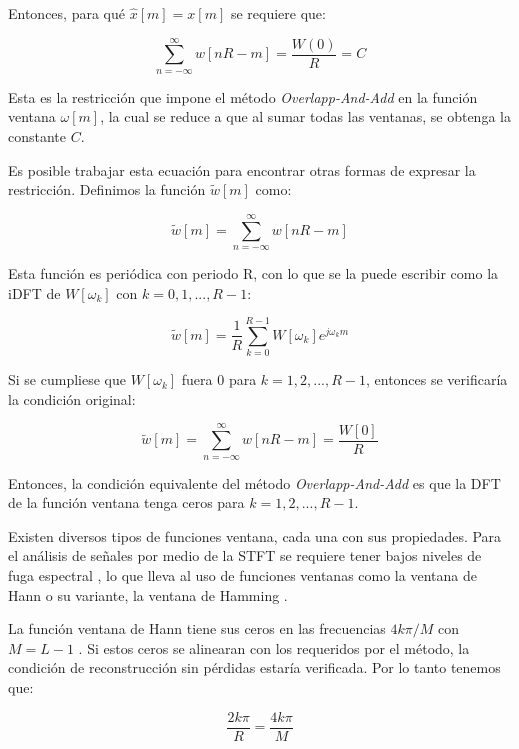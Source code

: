 Entonces, para qué $\hat{x}[m] = x[m]$ se requiere que:

\begin{equation*}
	\sum_{n=-\infty}^{\infty} w[nR-m] = \frac{W(0)}{R} = C
\end{equation*}

Esta es la restricción que impone el método \emph{Overlapp-And-Add} en la función ventana $\omega[m]$, la cual se reduce a que al sumar todas las ventanas, se obtenga la constante $C$. 

Es posible trabajar esta ecuación para encontrar otras formas de expresar la restricción. Definimos la función  $\tilde{w}[m]$ como:

\begin{equation*}
	\tilde{w}[m] = \sum_{n=-\infty}^{\infty} w[nR-m]
\end{equation*}

Esta función es periódica con periodo R, con lo que se la puede escribir como la iDFT de $W[\omega_k]$ con $k = 0, 1, ..., R-1$:

\begin{equation*}
	\tilde{w}[m] = \frac{1}{R} \sum_{k=0}^{R-1} W[\omega_{k}] e^{j \omega_{k} m}
\end{equation*}

Si se cumpliese que $W[\omega_{k}]$ fuera 0 para $k = 1, 2, ..., R-1$, entonces se verificaría la condición original:

\begin{equation*}
	\tilde{w}[m] = \sum_{n=-\infty}^{\infty} w[nR-m] = \frac{W[0]}{R}
\end{equation*}

Entonces, la condición equivalente del método \emph{Overlapp-And-Add} es que la DFT de la función ventana tenga ceros para $k = 1, 2, ..., R-1$.

Existen diversos tipos de funciones ventana, cada una con sus propiedades. Para el análisis de señales por medio de la STFT se requiere tener bajos niveles de fuga espectral \cite{speech_enhancement_theory_and_practice}, lo que lleva al uso de funciones ventanas como la ventana de Hann o su variante, la ventana de Hamming \cite{oppenheim_schafer}.

La función ventana de Hann tiene sus ceros en las frecuencias $4 k \pi/M$ con $M = L - 1$ \cite{oppenheim_schafer}. Si estos ceros se alinearan con los requeridos por el método, la condición de reconstrucción sin pérdidas estaría verificada. Por lo tanto tenemos que:

\begin{equation*}
	\frac{2k\pi}{R} = \frac{4 k \pi}{M}
\end{equation*}

